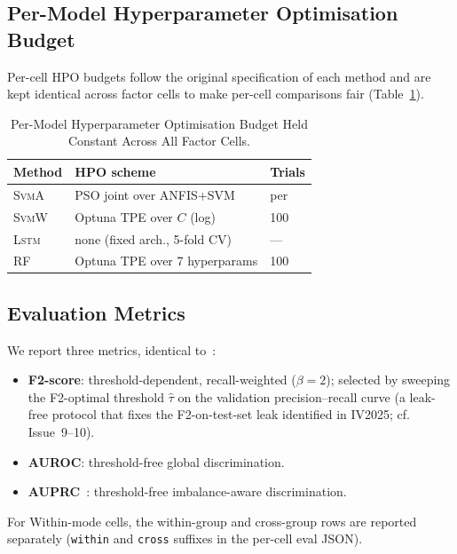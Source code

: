 \documentclass[lettersize,journal]{IEEEtran}
\newcommand{\Impl}[1]{\textsc{#1}}
\begin{document}
\subsection{Per-Model Hyperparameter Optimisation Budget}\label{sec:hpo_budget}
Per-cell HPO budgets follow the original specification of each method and are kept identical across factor cells to make per-cell comparisons fair (Table~\ref{tab:hpo_budget}).
\begin{table}[!t]
\caption{Per-Model Hyperparameter Optimisation Budget Held Constant Across All Factor Cells.\label{tab:hpo_budget}}
\centering
\begin{tabular}{|l|l|l|}
\hline
Method & HPO scheme & Trials \\
\hline
\Impl{SvmA} & PSO joint over ANFIS+SVM & per~\cite{arefnezhad2019} \\
\hline
\Impl{SvmW} & Optuna TPE over $C$ (log) & 100 \\
\hline
\Impl{Lstm} & none (fixed arch., 5-fold CV) & --- \\
\hline
\Impl{RF}~\cite{nakagama2025factorial} & Optuna TPE over 7 hyperparams & 100 \\
\hline
\end{tabular}
\end{table}

\subsection{Evaluation Metrics}\label{sec:metrics}
We report three metrics, identical to~\cite{nakagama2025factorial}:
\begin{itemize}
\item \textbf{F2-score}: threshold-dependent, recall-weighted ($\beta = 2$); selected by sweeping the F2-optimal threshold $\hat{\tau}$ on the validation precision--recall curve (a leak-free protocol that fixes the F2-on-test-set leak identified in IV2025; cf.~\cite{nakagama2025iv} Issue~9--10).
\item \textbf{AUROC}: threshold-free global discrimination.
\item \textbf{AUPRC}~\cite{saito2015}: threshold-free imbalance-aware discrimination.
\end{itemize}
For Within-mode cells, the within-group and cross-group rows are reported separately (\texttt{within} and \texttt{cross} suffixes in the per-cell eval JSON).
\end{document}
